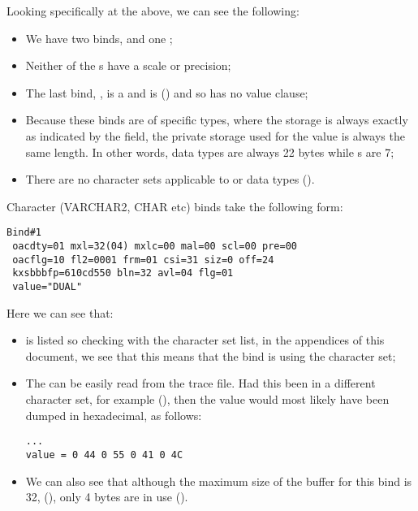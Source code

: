 Looking specifically at the above, we can see the following:

\begin{itemize}
\tightlist
\item
  We have two  binds, and one ;
\item
  Neither of the s have a scale or precision;
\item
  The last bind, , is a  and is  () and so has no value clause;
\item
  Because these binds are of specific types, where the storage is always exactly as indicated by the  field, the private storage used for the value is always the same length. In other words,  data types are always 22 bytes while s are 7;
\item
  There are no character sets applicable to  or  data types ().
\end{itemize}

Character (VARCHAR2, CHAR etc) binds take the following form:

\begin{lstlisting}[numbers=none,caption={Bind Example - VARCHAR2 with WE8ISO8859P1 Characterset}]
Bind#1
 oacdty=01 mxl=32(04) mxlc=00 mal=00 scl=00 pre=00
 oacflg=10 fl2=0001 frm=01 csi=31 siz=0 off=24
 kxsbbbfp=610cd550 bln=32 avl=04 flg=01
 value="DUAL"
\end{lstlisting}

Here we can see that:

\begin{itemize}
\item
   is listed so checking with the character set list, in the appendices of this document, we see that this means that the bind is using the  character set;
\item
  The  can be easily read from the trace file. Had this been in a different character set,  for example (), then the value would most likely have been dumped in hexadecimal, as follows:

\begin{lstlisting}[numbers=none,caption={Bind Example - VARCHAR2 with ALUTF16 Characterset}]
...
value = 0 44 0 55 0 41 0 4C
\end{lstlisting}
\item
  We can also see that although the maximum size of the buffer for this bind is 32, (), only 4 bytes are in use
  ().
\end{itemize}

